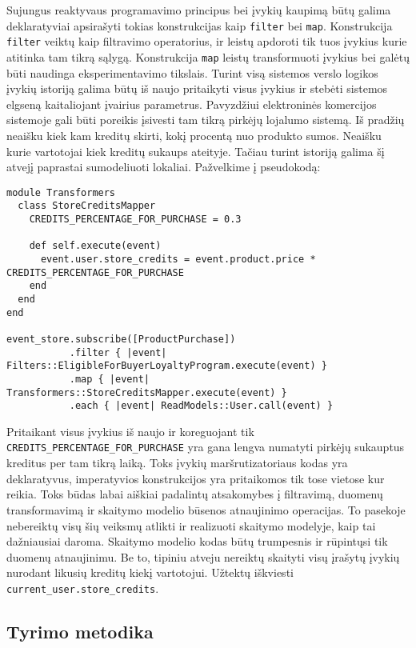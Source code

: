 Sujungus reaktyvaus programavimo principus bei įvykių kaupimą būtų galima deklaratyviai apsirašyti tokias konstrukcijas kaip \lstinline|filter| bei \lstinline|map|. Konstrukcija \lstinline|filter| veiktų kaip filtravimo operatorius, ir leistų apdoroti tik tuos įvykius kurie atitinka tam tikrą sąlygą. Konstrukcija \lstinline|map| leistų transformuoti įvykius bei galėtų būti naudinga eksperimentavimo tikslais. Turint visą sistemos verslo logikos įvykių istoriją galima būtų iš naujo pritaikyti visus įvykius ir stebėti sistemos elgseną kaitaliojant įvairius parametrus. Pavyzdžiui elektroninės komercijos sistemoje gali būti poreikis įsivesti tam tikrą pirkėjų lojalumo sistemą. Iš pradžių neaišku kiek kam kreditų skirti, kokį procentą nuo produkto sumos. Neaišku kurie vartotojai kiek kreditų sukaups ateityje. Tačiau turint istoriją galima šį atvejį paprastai sumodeliuoti lokaliai. Pažvelkime į pseudokodą:

\begin{lstlisting}[]
module Transformers
  class StoreCreditsMapper
    CREDITS_PERCENTAGE_FOR_PURCHASE = 0.3

    def self.execute(event)
      event.user.store_credits = event.product.price * CREDITS_PERCENTAGE_FOR_PURCHASE
    end
  end
end

event_store.subscribe([ProductPurchase])
           .filter { |event| Filters::EligibleForBuyerLoyaltyProgram.execute(event) }
           .map { |event| Transformers::StoreCreditsMapper.execute(event) }
           .each { |event| ReadModels::User.call(event) }
\end{lstlisting}

Pritaikant visus įvykius iš naujo ir koreguojant tik \lstinline|CREDITS_PERCENTAGE_FOR_PURCHASE| yra gana lengva numatyti pirkėjų sukauptus kreditus per tam tikrą laiką. Toks įvykių maršrutizatoriaus kodas yra deklaratyvus, imperatyvios konstrukcijos yra pritaikomos tik tose vietose kur reikia. Toks būdas labai aiškiai padalintų atsakomybes į filtravimą, duomenų transformavimą ir skaitymo modelio būsenos atnaujinimo operacijas. To pasekoje nebereiktų visų šių veiksmų atlikti ir realizuoti skaitymo modelyje, kaip tai dažniausiai daroma. Skaitymo modelio kodas būtų trumpesnis ir rūpintųsi tik duomenų atnaujinimu. Be to, tipiniu atveju nereiktų skaityti visų įrašytų įvykių nurodant likusių kreditų kiekį vartotojui. Užtektų iškviesti \lstinline|current_user.store_credits|.

\subsection{Tyrimo metodika}

